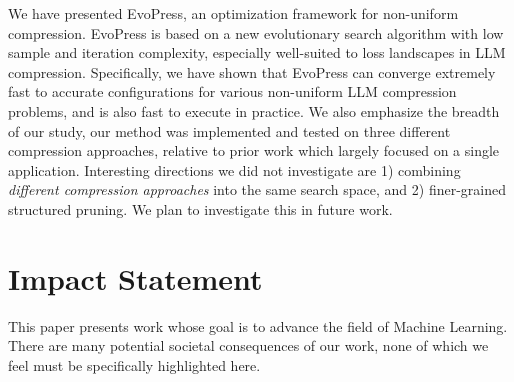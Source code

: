 \documentclass{article}
\theoremstyle{plain}
\theoremstyle{definition}
\theoremstyle{remark}
\newcommand{\methodname}{EvoPress}
\begin{document}
We have presented \methodname{}, an optimization framework for non-uniform compression. \methodname{} is based on a new evolutionary search algorithm with low sample and iteration complexity, especially well-suited to loss landscapes in LLM compression. Specifically, we have shown that \methodname{} can converge extremely fast to  accurate configurations for various non-uniform LLM compression problems, and is also fast to execute in practice. We also emphasize the breadth of our study, our method was implemented and tested on three different compression approaches, relative to prior work which largely focused on a single application. 
Interesting directions we did not investigate are 1) combining \emph{different compression approaches} into the same search space, and 2) finer-grained structured pruning. We plan to investigate this in future work. 

\section*{Impact Statement}
This paper presents work whose goal is to advance the field of Machine Learning. There are many potential societal consequences of our work, none of which we feel must be specifically highlighted here.






\end{document}
